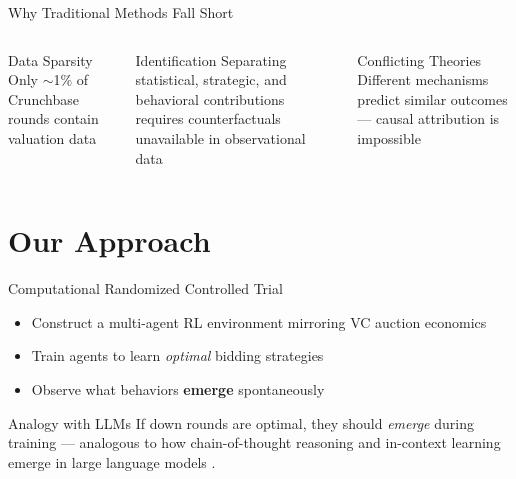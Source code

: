 \documentclass[aspectratio=169]{beamer}
\begin{document}
\begin{frame}{Why Traditional Methods Fall Short}
  \begin{columns}[T]
    \begin{block}{Data Sparsity}
      Only $\sim$1\% of Crunchbase rounds contain valuation data
    \end{block}

    \begin{block}{Identification}
      Separating statistical, strategic, and behavioral contributions requires counterfactuals unavailable in observational data
    \end{block}

    \begin{block}{Conflicting Theories}
      Different mechanisms predict similar outcomes --- causal attribution is impossible
    \end{block}
  \end{columns}
\end{frame}

\section{Our Approach}

\begin{frame}{Computational Randomized Controlled Trial}
  \begin{itemize}
    \item Construct a multi-agent RL environment mirroring VC auction economics
    \item Train agents to learn \emph{optimal} bidding strategies
    \item Observe what behaviors \textbf{emerge} spontaneously
  \end{itemize}

  \vspace{0.4cm}
  \begin{block}{Analogy with LLMs}
    If down rounds are optimal, they should \emph{emerge} during training --- analogous to how chain-of-thought reasoning and in-context learning emerge in large language models \citep{brown2020, wei2022}.
  \end{block}

  \vspace{0.4cm}
  \begin{center}
  \end{center}
\end{frame}
\end{document}
